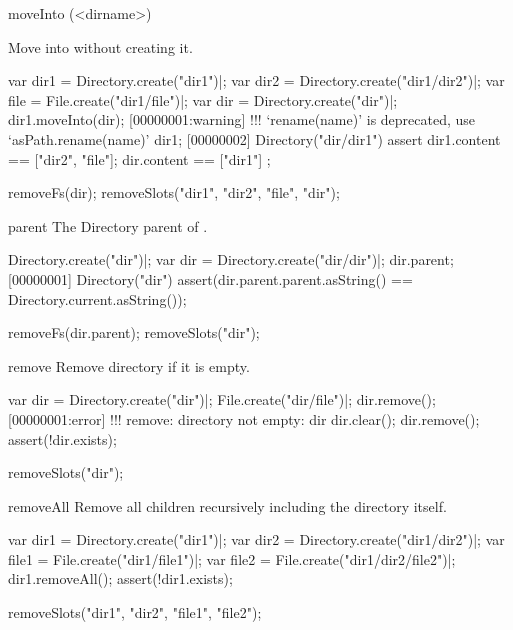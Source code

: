 \begin{urbiscriptapi}
\item[moveInto](<dirname>)
  \experimental{}

  Move \this into  without creating it.
\begin{urbiscript}[firstnumber=1]
var dir1 = Directory.create("dir1")|;
var dir2 = Directory.create("dir1/dir2")|;
var file = File.create("dir1/file")|;
var dir = Directory.create("dir")|;
dir1.moveInto(dir);
[00000001:warning] !!! `rename(name)' is deprecated, use `asPath.rename(name)'
dir1;
[00000002] Directory("dir/dir1")
assert
{
  dir1.content == ["dir2", "file"];
  dir.content == ["dir1"]
};
\end{urbiscript}
\begin{urbicomment}
removeFs(dir);
removeSlots("dir1", "dir2", "file", "dir");
\end{urbicomment}


\item[parent]
  The Directory parent of \this.
\begin{urbiscript}
Directory.create("dir")|;
var dir = Directory.create("dir/dir")|;
dir.parent;
[00000001] Directory("dir")
assert(dir.parent.parent.asString() == Directory.current.asString());
\end{urbiscript}
\begin{urbicomment}
removeFs(dir.parent);
removeSlots("dir");
\end{urbicomment}


\item[remove]%
  Remove \this directory if it is empty.
\begin{urbiscript}
var dir = Directory.create("dir")|;
File.create("dir/file")|;
dir.remove();
[00000001:error] !!! remove: directory not empty: dir
dir.clear();
dir.remove();
assert(!dir.exists);
\end{urbiscript}
\begin{urbicomment}
removeSlots("dir");
\end{urbicomment}


\item[removeAll]
  Remove all children recursively including the directory itself.
\begin{urbiscript}
var dir1 = Directory.create("dir1")|;
var dir2 = Directory.create("dir1/dir2")|;
var file1 = File.create("dir1/file1")|;
var file2 = File.create("dir1/dir2/file2")|;
dir1.removeAll();
assert(!dir1.exists);
\end{urbiscript}
\begin{urbicomment}
removeSlots("dir1", "dir2", "file1", "file2");
\end{urbicomment}



\end{urbiscriptapi}
